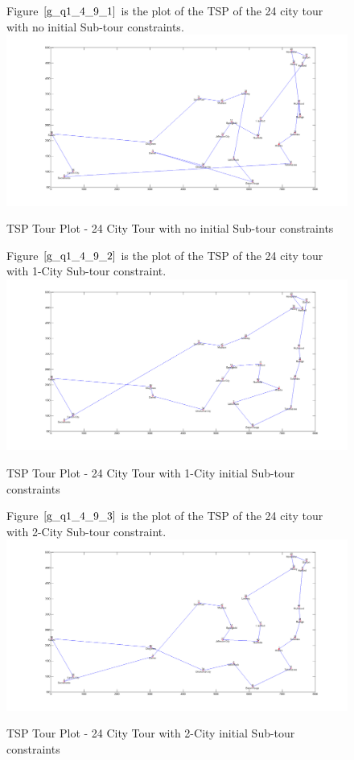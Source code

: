 \documentclass[twoside,12pt]{article}
\begin{document}
\begin{figure}[!htbp]
\centering
Figure $\eqref{g_q1_4_9_1}$ is the plot of the TSP of the 24 city tour with no initial Sub-tour constraints. 
\includegraphics[width=1.35\textwidth,left]{0_city/all_24_with_0} 
\caption{TSP Tour Plot - 24 City Tour with no initial Sub-tour constraints}
\label{g_q1_4_9_1}
\end{figure}
\FloatBarrier


\begin{figure}[!htbp]
\centering
Figure $\eqref{g_q1_4_9_2}$ is the plot of the TSP of the 24 city tour with 1-City Sub-tour constraint. 
 \includegraphics[width=1.29\textwidth,left]{1_city/all_24_with_1} 
\caption{TSP Tour Plot - 24 City Tour with 1-City initial Sub-tour constraints}
\label{g_q1_4_9_2}
\end{figure}
\FloatBarrier

\begin{figure}[!htbp]
\centering
Figure $\eqref{g_q1_4_9_3}$ is the plot of the TSP of the 24 city tour with 2-City Sub-tour constraint. 
 \includegraphics[width=1.38\textwidth,left]{2_city/all_24_with_2} 
\caption{TSP Tour Plot - 24 City Tour with 2-City initial Sub-tour constraints}
\label{g_q1_4_9_3}
\end{figure}
\FloatBarrier
\end{document}
